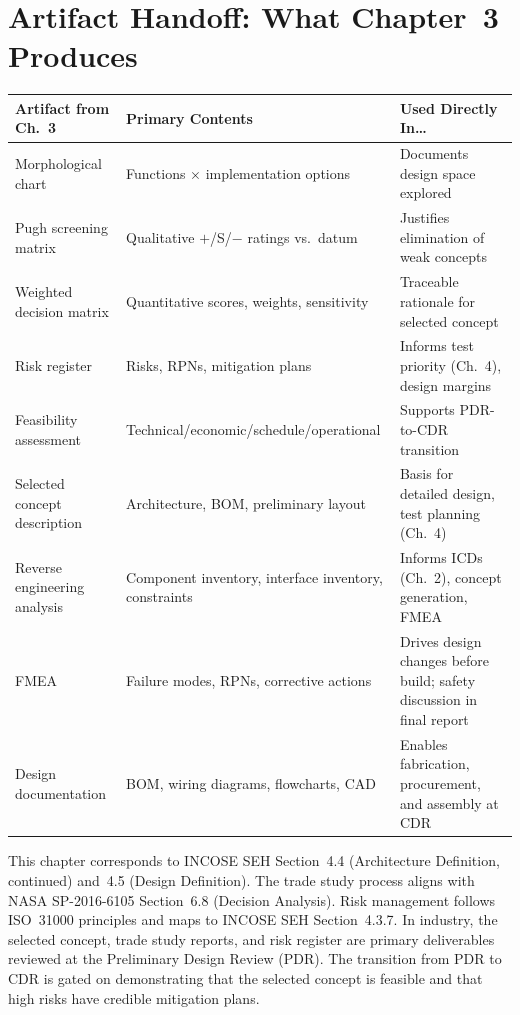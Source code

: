 \documentclass[11pt,letterpaper,twoside,openany]{book}
\begin{document}
\FloatBarrier
\section{Artifact Handoff: What Chapter~3 Produces}

\begin{center}
\small
\begin{tabularx}{\textwidth}{l X X}
\toprule
\textbf{Artifact from Ch.~3} & \textbf{Primary Contents} & \textbf{Used Directly In\ldots} \\
\midrule
Morphological chart & Functions $\times$ implementation options & Documents design space explored \\
Pugh screening matrix & Qualitative $+$/S/$-$ ratings vs.\ datum & Justifies elimination of weak concepts \\
Weighted decision matrix & Quantitative scores, weights, sensitivity & Traceable rationale for selected concept \\
Risk register & Risks, RPNs, mitigation plans & Informs test priority (Ch.~4), design margins \\
Feasibility assessment & Technical/economic/schedule/operational & Supports PDR-to-CDR transition \\
Selected concept description & Architecture, BOM, preliminary layout & Basis for detailed design, test planning (Ch.~4) \\
Reverse engineering analysis & Component inventory, interface inventory, constraints & Informs ICDs (Ch.~2), concept generation, FMEA \\
FMEA & Failure modes, RPNs, corrective actions & Drives design changes before build; safety discussion in final report \\
Design documentation & BOM, wiring diagrams, flowcharts, CAD & Enables fabrication, procurement, and assembly at CDR \\
\bottomrule
\end{tabularx}
\end{center}

\begin{tipbox}
This chapter corresponds to INCOSE SEH Section~4.4 (Architecture Definition, continued) and~4.5 (Design Definition). The trade study process aligns with NASA SP-2016-6105 Section~6.8 (Decision Analysis). Risk management follows ISO~31000 principles and maps to INCOSE SEH Section~4.3.7. In industry, the selected concept, trade study reports, and risk register are primary deliverables reviewed at the Preliminary Design Review (PDR). The transition from PDR to CDR is gated on demonstrating that the selected concept is feasible and that high risks have credible mitigation plans.
\end{tipbox}
\end{document}
